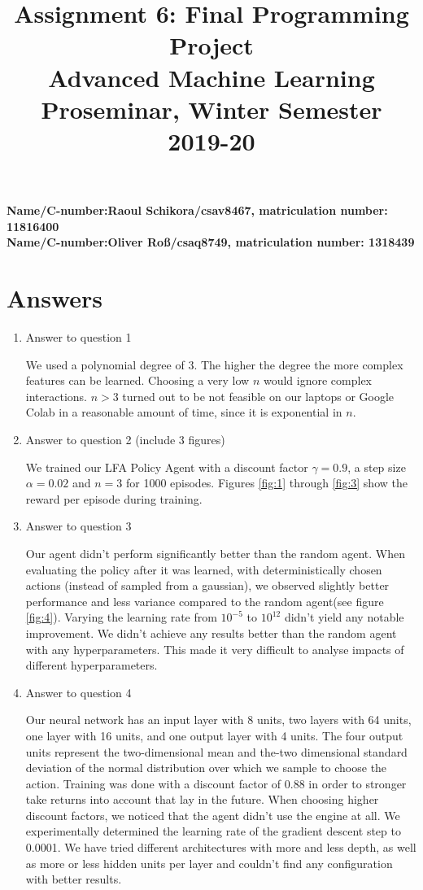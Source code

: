 \documentclass[11pt,a4paper]{article}
\title{\textbf{Assignment 6: Final Programming Project} \\ \Large Advanced Machine Learning Proseminar, Winter Semester 2019-20}
\date{}
\begin{document}
\maketitle

\vspace{-1cm}

\noindent
\textbf{Name/C-number:Raoul Schikora/csav8467, matriculation number: 11816400}  \\
\textbf{Name/C-number:Oliver Roß/csaq8749, matriculation number: 1318439}  \\

\section{Answers}

\begin{enumerate}
\item Answer to question 1
	
We used a polynomial degree of 3. The higher the degree the more complex features can be learned. Choosing a very low $n$ would ignore complex interactions. $n>3$ turned out to be not feasible on our laptops or Google Colab in a reasonable amount of time, since it is exponential in $n$.

\item Answer to question 2 (include 3 figures)

We trained our LFA Policy Agent with a discount factor $\gamma = 0.9$, a step size $\alpha = 0.02$ and $n = 3$ for 1000 episodes.
	Figures \ref{fig:1} through \ref{fig:3} show the reward per episode during training.
\item Answer to question 3 
	
Our agent didn't perform significantly better than the random agent. When evaluating the policy after it was learned, with deterministically chosen actions (instead of sampled from a gaussian), we observed slightly better performance and less variance compared to the random agent(see figure \ref{fig:4}). Varying the learning rate from $10^{-5}$ to $10^{12}$ didn't yield any notable improvement. We didn't achieve any results better than the random agent with any hyperparameters. This made it very difficult to analyse impacts of different hyperparameters.
	
\item Answer to question 4

	Our neural network has an input layer with 8 units, two layers with 64 units, one layer with 16 units, and one output layer with 4 units. The four output units represent the two-dimensional mean and the-two dimensional standard deviation of the normal distribution over which we sample to choose the action. Training was done with a discount factor of 0.88 in order to stronger take returns into account that lay in the future. When choosing higher discount factors, we noticed that the agent didn't use the engine at all. We experimentally determined the learning rate of the gradient descent step to 0.0001. We have tried different architectures with more and less depth, as well as more or less hidden units per layer and couldn't find any configuration with better results.


\end{enumerate}
\end{document}
